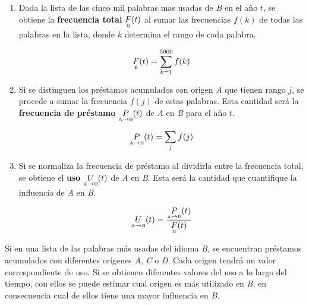 \begin{enumerate}
	\label{proceso_uso}
	
	\item  Dada la lista de las cinco mil palabras mas usadas de \textit{B} en el año $t$, se obtiene la \textbf{frecuencia total} $\underset{\text{\tiny B}}{F}(t)$ al sumar las frecuencias $f(k)$ de todas las palabras en la lista, donde $k$ determina el rango  de cada palabra.
	
	\begin{equation}
	\label{ec.ftot}
	\underset{\text{\tiny B}}{F}(t) = \sum_{k=1}^{5000} f(k)
	\end{equation}

	
	\item Si se distinguen los préstamos acumulados con origen \textit{A}  que tienen rango $j$,  se procede a sumar la frecuencia $f(j)$ de estas palabras.  Esta cantidad será la  \textbf{frecuencia de préstamo} $\underset{ \text{\tiny A} \to  \text{\tiny B} }{P}(t)$   de \textit{A} en \textit{B} para el año $t$.
	
	\begin{equation}
	\label{ec.fpres}
	\underset{ \text{\tiny A} \to  \text{\tiny B} }{P}(t) = \sum_{j} f(j)
	\end{equation}
	
	
	\item Si se normaliza la frecuencia de préstamo al dividirla entre la frecuencia total, se obtiene el \textbf{uso} $\underset{ \text{\tiny A} \to  \text{\tiny B} }{U}(t)$  de \textit{A} en \textit{B}.  Esta será la cantidad  que cuantifique la influencia de \textit{A} en \textit{B}.
	
	\begin{equation}
	\label{ec.fuso}
	\underset{ \text{\tiny A} \to  \text{\tiny B} }{U}(t) = \frac{	\underset{ \text{\tiny A} \to  \text{\tiny B} }{P}(t)}{\underset{\text{\tiny B}}{F}(t) }
	\end{equation}
	 
	
	
\end{enumerate}

Si en una lista de las palabras más usadas del idioma \textit{B}, se encuentran préstamos acumulados con diferentes orígenes \textit{A}, \textit{C} o \textit{D}. Cada origen tendrá un valor correspondiente de uso. Si se obtienen diferentes valores del uso a lo largo del tiempo,  con ellos se puede estimar cual origen es más utilizado en \textit{B},  en consecuencia cual de ellos tiene una mayor influencia en \textit{B}.

